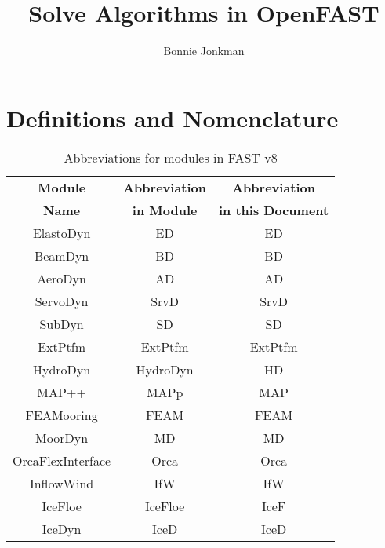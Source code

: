 \documentclass[10pt,letterpaper,oneside,notitlepage]{article}
\begin{document}
\title{Solve Algorithms in OpenFAST}
\author{Bonnie Jonkman}
\maketitle


\section{Definitions and Nomenclature}


\begin{table}[h]
   \centering
      \begin{tabular}{c|c|c}
      \textbf{Module} & \textbf{Abbreviation} & \textbf{Abbreviation}\\
      \textbf{Name}   & \textbf{in Module}    & \textbf{in this Document}\\
      \hline 
      ElastoDyn          & ED                    & ED        \\
      BeamDyn            & BD                    & BD        \\
      AeroDyn            & AD                    & AD        \\
      ServoDyn           & SrvD                  & SrvD      \\
      SubDyn             & SD                    & SD        \\
      ExtPtfm            & ExtPtfm               & ExtPtfm   \\
      HydroDyn           & HydroDyn              & HD        \\
      MAP++              & MAPp                  & MAP       \\
      FEAMooring         & FEAM                  & FEAM      \\
      MoorDyn            & MD                    & MD        \\
      OrcaFlexInterface  & Orca                  & Orca      \\
      InflowWind         & IfW                   & IfW       \\   
      IceFloe            & IceFloe               & IceF      \\   
      IceDyn             & IceD                  & IceD      \\   
      \end{tabular}
   \caption{Abbreviations for modules in FAST v8}
   \label{tab:Abbrev}
\end{table}
\end{document}
